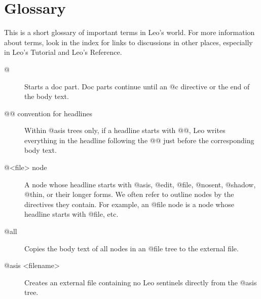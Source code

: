 \documentclass[a4paper,10pt,english]{sphinxmanual}
\begin{document}
\chapter{Glossary}
\label{glossary::doc}\label{glossary:glossary}
This is a short glossary of important terms in Leo's world. For more information
about terms, look in the index for links to discussions in other places,
especially in Leo's Tutorial and Leo's Reference.
\begin{description}
\end{description}

\begin{description}
\item[{@}] \leavevmode
Starts a doc part. Doc parts continue until an @c
directive or the end of the body text.

\end{description}

\begin{description}
\item[{@@ convention for headlines}] \leavevmode
Within @asis trees only, if a headline starts with @@, Leo
writes everything in the headline following the @@ just before the
corresponding body text.

\end{description}

\begin{description}
\item[{@\textless{}file\textgreater{} node}] \leavevmode
A node whose headline starts with
@asis, @edit, @file, @nosent, @shadow, @thin, or their longer forms.
We often refer to outline nodes by the directives they contain.
For example, an @file node is a node whose headline starts with @file, etc.

\end{description}

\begin{description}
\item[{@all}] \leavevmode
Copies the body text of all nodes in an @file tree to the external file.

\end{description}

\begin{description}
\item[{@asis \textless{}filename\textgreater{}}] \leavevmode
Creates an external file containing no Leo sentinels directly from the @asis tree.

\end{description}
\end{document}
